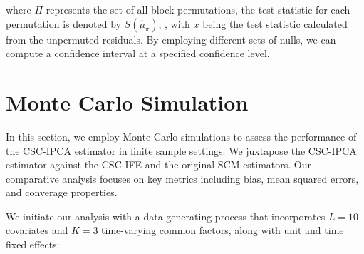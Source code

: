 \documentclass[12pt]{article}
\begin{document}
\noindent where $\Pi$ represents the set of all block permutations, the test statistic for each permutation is denoted by $S(\hat{\mu}_{\pi})$, , with $x$ being the test statistic calculated from the unpermuted residuals. By employing different sets of nulls, we can compute a confidence interval at a specified confidence level.

\section{Monte Carlo Simulation}
\label{sec: simulation}

In this section, we employ Monte Carlo simulations to assess the performance of the CSC-IPCA estimator in finite sample settings. We juxtapose the CSC-IPCA estimator against the CSC-IFE and the original SCM estimators. Our comparative analysis focuses on key metrics including bias, mean squared errors, and converage properties. 

We initiate our analysis with a data generating process that incorporates $L=10$ covariates and $K=3$ time-varying common factors, along with unit and time fixed effects:
\end{document}
